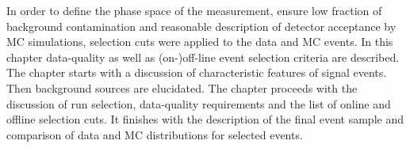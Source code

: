 In order to define the phase space of the measurement, ensure low fraction of background contamination and reasonable description of detector acceptance by MC simulations, selection cuts were applied to the data and MC events. In this chapter data-quality as well as (on-)off-line event selection criteria are described. The chapter starts with a discussion of characteristic features of signal events. Then background sources are elucidated. The chapter proceeds with the discussion of run selection, data-quality requirements and the list of online and offline selection cuts. It finishes with the description of the final event sample and comparison of data and MC distributions for selected events.


